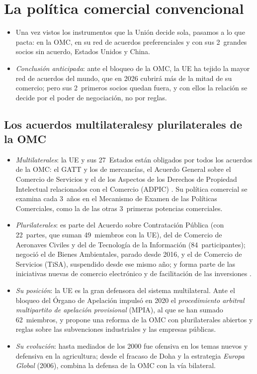 \documentclass[11pt]{article}
\begin{document}
\section{La política comercial convencional}\label{sec:convencional}

\begin{itemize}
\item Una vez vistos los instrumentos que la Unión decide sola, pasamos a lo que pacta: en la OMC, en su red de acuerdos preferenciales y con sus 2~grandes socios sin acuerdo, Estados Unidos y China.
\item \emph{Conclusión anticipada}: ante el bloqueo de la OMC, la UE ha tejido la mayor red de acuerdos del mundo, que en 2026 cubrirá más de la mitad de su comercio; pero sus 2~primeros socios quedan fuera, y con ellos la relación se decide por el poder de negociación, no por reglas.
\end{itemize}

\subsection{Los acuerdos multilaterales\cortetitulo y plurilaterales de la OMC}\label{sec:omc}

\begin{itemize}
\item \emph{Multilaterales}: la UE y sus 27~Estados están obligados por todos los acuerdos de la OMC: el GATT y los de mercancías, el Acuerdo General sobre el Comercio de Servicios y el de los Aspectos de los Derechos de Propiedad Intelectual relacionados con el Comercio (ADPIC)  . Su política comercial se examina cada 3~años en el Mecanismo de Examen de las Políticas Comerciales, como la de las otras 3~primeras potencias comerciales.
\item \emph{Plurilaterales}: es parte del Acuerdo sobre Contratación Pública (con 22~partes, que suman 49~miembros con la UE), del de Comercio de Aeronaves Civiles y del de Tecnología de la Información (84~participantes); negoció el de Bienes Ambientales, parado desde 2016, y el de Comercio de Servicios (TiSA), suspendido desde ese mismo año; y forma parte de las iniciativas nuevas de comercio electrónico y de facilitación de las inversiones .
\item \emph{Su posición}: la UE es la gran defensora del sistema multilateral. Ante el bloqueo del Órgano de Apelación impulsó en 2020 el \emph{procedimiento arbitral multipartito de apelación provisional} (MPIA), al que se han sumado 62~miembros, y propone una reforma de la OMC con plurilaterales abiertos y reglas sobre las subvenciones industriales y las empresas públicas\nocite{CE2026MPIA}.
\item \emph{Su evolución}: hasta mediados de los 2000 fue ofensiva en los temas nuevos y defensiva en la agricultura; desde el fracaso de Doha y la estrategia \emph{Europa Global} (2006), combina la defensa de la OMC con la vía bilateral.
\end{itemize}
\end{document}
